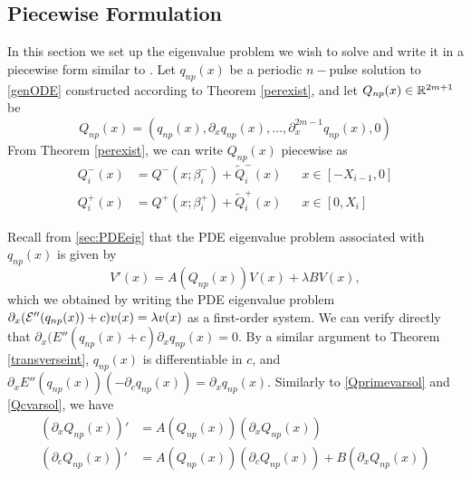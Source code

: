 \documentclass[thesis.tex]{subfiles}
\begin{document}
\subsection{Piecewise Formulation}

In this section we set up the eigenvalue problem we wish to solve and write it in a piecewise form similar to \cite{Sandstede1998}. Let $q_{np}(x)$ be a periodic $n-$pulse solution to \eqref{genODE} constructed according to Theorem \ref{perexist}, and let $Q_{np}(x) \in \mathbb{R}^{2m+1}$ be
\[
Q_{np}(x) = ( q_{np}(x), \partial_x q_{np}(x), \dots, \partial_x^{2m-1} q_{np}(x), 0 )
\]
From Theorem \ref{perexist}, we can write $Q_{np}(x)$ piecewise as
\begin{equation}\label{Qnppiece}
\begin{aligned}
Q_i^-(x) &= Q^-(x; \beta_i^-) + \tilde{Q}_i^-(x) && x \in [-X_{i-1}, 0] \\
Q_i^+(x) &= Q^+(x; \beta_i^+) + \tilde{Q}_i^+(x) && x \in [0, X_i]
\end{aligned}
\end{equation}

Recall from \cref{sec:PDEeig} that the PDE eigenvalue problem associated with $q_{np}(x)$ is given by 
\begin{equation}\label{PDEeig4}
V'(x) = A(Q_{np}(x))V(x) + \lambda B V(x),
\end{equation}
which we obtained by writing the PDE eigenvalue problem $\partial_x (\mathcal{E}''(q_{np}(x)) + c )v(x) = \lambda v(x)$ as a first-order system. We can verify directly that $\partial_x (E''(q_{np}(x) + c) \partial_x q_{np}(x) = 0$. By a similar argument to Theorem \ref{transverseint}, $q_{np}(x)$ is differentiable in $c$, and $\partial_x E''(q_{np}(x)) (-\partial_c q_{np}(x)) = \partial_x q_{np}(x)$. Similarly to \eqref{Qprimevarsol} and \eqref{Qcvarsol}, we have
\begin{equation}\label{Arelations}
\begin{aligned}
(\partial_x Q_{np}(x))' &= A(Q_{np}(x)) (\partial_x Q_{np}(x)) \\
(\partial_c Q_{np}(x))' &= A(Q_{np}(x)) (\partial_c Q_{np}(x)) + B (\partial_x Q_{np}(x)) 
\end{aligned}
\end{equation}
\end{document}
